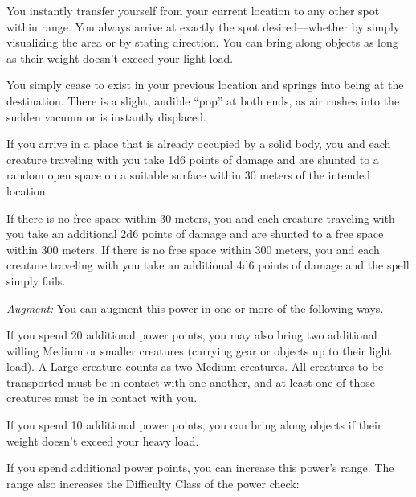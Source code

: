 {
	You instantly transfer yourself from your current location to any other spot within range. You always arrive at exactly the spot desired---whether by simply visualizing the area or by stating direction. You can bring along objects as long as their weight doesn't exceed your light load.

	You simply cease to exist in your previous location and springs into being at the destination. There is a slight, audible ``pop'' at both ends, as air rushes into the sudden vacuum or is instantly displaced.

	If you arrive in a place that is already occupied by a solid body, you and each creature traveling with you take 1d6 points of damage and are shunted to a random open space on a suitable surface within 30 meters of the intended location.

	If there is no free space within 30 meters, you and each creature traveling with you take an additional 2d6 points of damage and are shunted to a free space within 300 meters. If there is no free space within 300 meters, you and each creature traveling with you take an additional 4d6 points of damage and the spell simply fails.

	\textit{Augment:} You can augment this power in one or more of the following ways.
	\begin{enumerate*}
	\item If you spend 20 additional power points, you may also bring two additional willing Medium or smaller creatures (carrying gear or objects up to their light load). A Large creature counts as two Medium creatures. All creatures to be transported must be in contact with one another, and at least one of those creatures must be in contact with you.
	\item If you spend 10 additional power points, you can bring along objects if their weight doesn't exceed your heavy load.
	\item If you spend additional power points, you can increase this power's range. The range also increases the Difficulty Class of the power check: 
	\end{enumerate*}


}